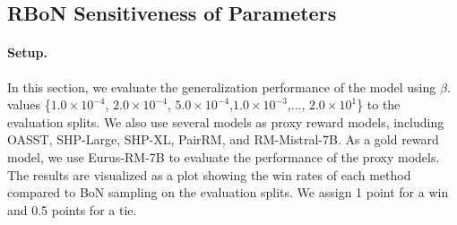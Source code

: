 
\subsection{RBoN Sensitiveness of Parameters}\label{Ex:parameter}

\paragraph{Setup.}


In this section, we evaluate the generalization performance of the model using $\beta$.
values \{$1.0\times 10^{-4}$, $2.0\times 10^{-4}$, $5.0\times 10^{-4}$,$1.0\times 10^{-3}$,..., $2.0\times 10^1$\} to the evaluation splits. We also use several models as proxy reward models, including OASST, SHP-Large, SHP-XL, PairRM, and RM-Mistral-7B. As a gold reward model, we use Eurus-RM-7B to evaluate the performance of the proxy models.
The results are visualized as a plot showing the win rates of each method compared to BoN sampling on the evaluation splits. We assign 1 point for a win and 0.5 points for a tie. 

